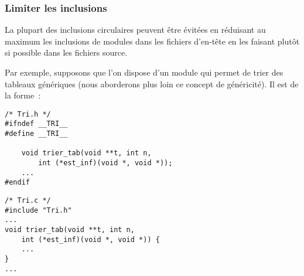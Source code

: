 \begin{frame}[fragile]
\frametitle{Limiter les inclusions}
La plupart des inclusions circulaires peuvent être évitées en
\alert{réduisant au maximum les inclusions} de modules dans les
\alert{fichiers d'en-tête} en les faisant plutôt si possible dans les
fichiers source.
\bigskip
\bigskip

Par exemple, supposons que l'on dispose d'un module  qui
permet de trier des tableaux génériques (nous aborderons plus loin ce
concept de généricité). Il est de la forme~:
\medskip

\begin{minipage}[c]{.45\textwidth}
\begin{lstlisting}[frame=single,numbers=none,basicstyle=\ttfamily\scriptsize]
/* Tri.h */
#ifndef __TRI__
#define __TRI__

    void trier_tab(void **t, int n,
        int (*est_inf)(void *, void *));
    ...
#endif
\end{lstlisting}
\end{minipage}
\quad
\begin{minipage}[c]{.45\textwidth}
\begin{lstlisting}[frame=single,numbers=none,basicstyle=\ttfamily\scriptsize]
/* Tri.c */
#include "Tri.h"
...
void trier_tab(void **t, int n,
    int (*est_inf)(void *, void *)) {
    ...
}
...
\end{lstlisting}
\end{minipage}
\end{frame}

